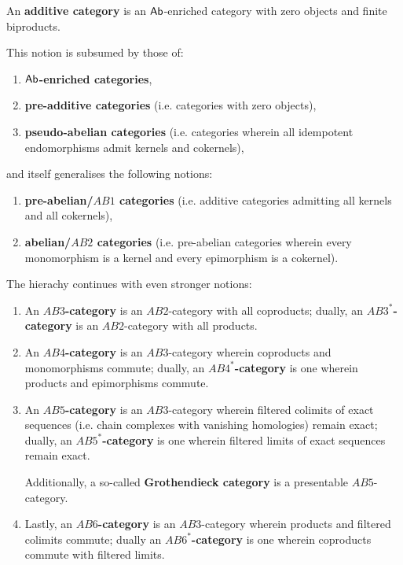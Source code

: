                 \begin{definition} \label{def: AB_categories}
                    An \textbf{additive category} is an $\mathsf{Ab}$-enriched category with zero objects and finite biproducts.
                    
                    This notion is subsumed by those of:
                        \begin{enumerate}
                            \item \textbf{$\mathsf{Ab}$-enriched categories},
                            \item \textbf{pre-additive categories} (i.e. categories with zero objects),
                            \item \textbf{pseudo-abelian categories} (i.e. categories wherein all idempotent endomorphisms admit kernels and cokernels),
                        \end{enumerate}
                    and itself generalises the following notions:
                        \begin{enumerate}
                            \item \textbf{pre-abelian/$AB1$ categories} (i.e. additive categories admitting all kernels and all cokernels),
                            \item \textbf{abelian/$AB2$ categories} (i.e. pre-abelian categories wherein every monomorphism is a kernel and every epimorphism is a cokernel).
                        \end{enumerate}
                    The hierachy continues with even stronger notions:
                        \begin{enumerate}
                            \item An \textbf{$AB3$-category} is an $AB2$-category with all coproducts; dually, an \textbf{$AB3^*$-category} is an $AB2$-category with all products.
                            \item An \textbf{$AB4$-category} is an $AB3$-category wherein coproducts and monomorphisms commute; dually, an \textbf{$AB4^*$-category} is one wherein products and epimorphisms commute.
                            \item An \textbf{$AB5$-category} is an $AB3$-category wherein filtered colimits of exact sequences (i.e. chain complexes with vanishing homologies) remain exact; dually, an \textbf{$AB5^*$-category} is one wherein filtered limits of exact sequences remain exact.
                            
                            Additionally, a so-called \textbf{Grothendieck category} is a presentable $AB5$-category.
                            \item Lastly, an \textbf{$AB6$-category} is an $AB3$-category wherein products and filtered colimits commute; dually an \textbf{$AB6^*$-category} is one wherein coproducts commute with filtered limits.
                        \end{enumerate}
                \end{definition}
